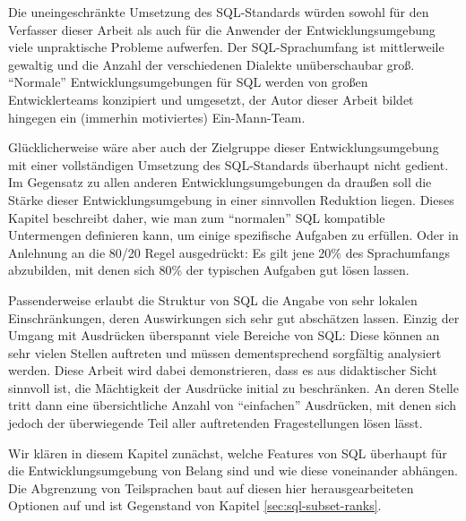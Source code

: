 Die uneingeschränkte Umsetzung des SQL-Standards würden sowohl für den Verfasser dieser Arbeit als auch für die Anwender der Entwicklungsumgebung viele unpraktische Probleme aufwerfen. Der SQL-Sprachumfang ist mittlerweile gewaltig und die Anzahl der verschiedenen Dialekte unüberschaubar groß. ``Normale'' Entwicklungsumgebungen für SQL werden von großen Entwicklerteams konzipiert und umgesetzt, der Autor dieser Arbeit bildet hingegen ein (immerhin motiviertes) Ein-Mann-Team.

Glücklicherweise wäre aber auch der Zielgruppe dieser Entwicklungsumgebung mit einer vollständigen Umsetzung des SQL-Standards überhaupt nicht gedient. Im Gegensatz zu allen anderen Entwicklungsumgebungen da draußen soll die Stärke dieser Entwicklungsumgebung in einer sinnvollen Reduktion liegen. Dieses Kapitel beschreibt daher, wie man zum ``normalen'' SQL kompatible Untermengen definieren kann, um einige spezifische Aufgaben zu erfüllen. Oder in Anlehnung an die 80/20 Regel ausgedrückt: Es gilt jene 20\% des Sprachumfangs abzubilden, mit denen sich 80\% der typischen Aufgaben gut lösen lassen.

Passenderweise erlaubt die Struktur von SQL die Angabe von sehr lokalen Einschränkungen, deren Auswirkungen sich sehr gut abschätzen lassen. Einzig der Umgang mit Ausdrücken überspannt viele Bereiche von SQL: Diese können an sehr vielen Stellen auftreten und müssen dementsprechend sorgfältig analysiert werden. Diese Arbeit wird dabei demonstrieren, dass es aus didaktischer Sicht sinnvoll ist, die Mächtigkeit der Ausdrücke initial zu beschränken. An deren Stelle tritt dann eine übersichtliche Anzahl von ``einfachen'' Ausdrücken, mit denen sich jedoch der überwiegende Teil aller auftretenden Fragestellungen lösen lässt.


Wir klären in diesem Kapitel zunächst, welche Features von SQL überhaupt für die Entwicklungsumgebung von Belang sind und wie diese voneinander abhängen. Die Abgrenzung von Teilsprachen baut auf diesen hier herausgearbeiteten Optionen auf und ist Gegenstand von Kapitel \ref{sec:sql-subset-ranks}.

